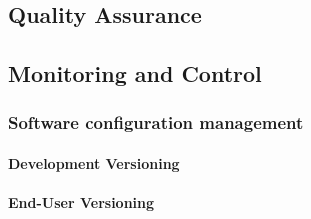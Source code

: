 \subsection{Quality Assurance}
\subsection{Monitoring and Control}
\subsubsection{Software configuration management}

 \paragraph{Development Versioning}
 \paragraph{End-User Versioning}



